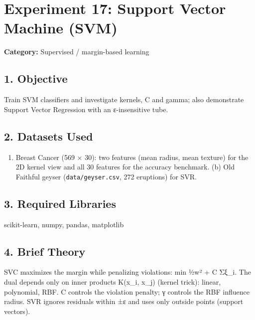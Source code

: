 
\chapter{Experiment 17: Support Vector Machine
(SVM)}\label{experiment-17-support-vector-machine-svm}

\textbf{Category:} Supervised / margin-based learning

\section{1. Objective}\label{objective}

Train SVM classifiers and investigate kernels, C and gamma; also
demonstrate Support Vector Regression with an ε-insensitive tube.

\section{2. Datasets Used}\label{datasets-used}

\begin{enumerate}
\def\labelenumi{(\alph{enumi})}
\tightlist
\item
  Breast Cancer (569 × 30): two features (mean radius, mean texture) for
  the 2D kernel view and all 30 features for the accuracy benchmark. (b)
  Old Faithful geyser (\passthrough{\lstinline!data/geyser.csv!}, 272
  eruptions) for SVR.
\end{enumerate}

\section{3. Required Libraries}\label{required-libraries}

scikit-learn, numpy, pandas, matplotlib

\section{4. Brief Theory}\label{brief-theory}

SVC maximizes the margin while penalizing violations: min
½\textbar\textbar w\textbar\textbar² + C Σξ\_i. The dual depends only on
inner products K(x\_i, x\_j) (kernel trick): linear, polynomial, RBF. C
controls the violation penalty; γ controls the RBF influence radius. SVR
ignores residuals within ±ε and uses only outside points (support
vectors).

